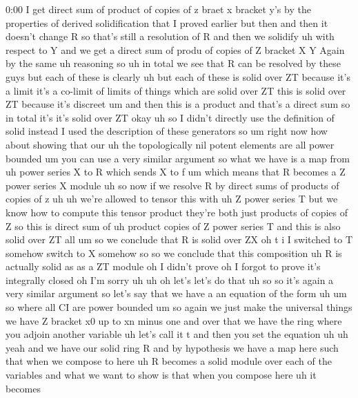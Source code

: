 \begin{unfinished}{0:00}
I  get  direct  sum  of  product  of  copies  of
z  braet
x  bracket  y's  by  the  properties  of
derived  solidification  that  I  proved
earlier  but  then  and  then  it  doesn't
change  R  so  that's  still  a  resolution  of
R  and  then  we  solidify  uh  with  respect
to  Y  and  we  get  a  direct  sum  of  produ  of
copies  of  Z  bracket  X  Y  Again  by  the
same  uh
reasoning  so  uh  in  total  we  see  that  R
can  be  resolved  by  these
guys  but  each  of  these  is  clearly  uh  but
each  of  these  is  solid  over  ZT  because
it's  a  limit  it's  a  co-limit  of  limits
of  things  which  are  solid  over
ZT
this  is  solid  over  ZT  because  it's
discreet  um  and  then  this  is  a  product
and  that's  a  direct  sum  so  in  total  it's
it's  solid  over
ZT
okay
uh  so  I  didn't  directly  use  the
definition  of  solid  instead  I  used  the
description  of  these
generators
so
um  right  now  how  about  showing  that
our  uh  the  topologically  nil  potent
elements  are  all  power  bounded  um  you
can  use  a  very  similar  argument  so  what
we  have  is  a  map  from  uh  power  series  X
to  R  which  sends  X  to
f  um  which  means  that  R  becomes  a  Z
power  series  X
module  uh  so  now  if  we  resolve  R  by
direct  sums  of  products  of  copies  of  z
uh  uh  we're  allowed  to  tensor  this  with
uh  Z  power  series  T  but  we  know  how  to
compute  this  tensor  product  they're  both
just  products  of  copies  of  Z  so  this  is
direct  sum  of
uh  product  copies  of  Z  power  series  T
and  this  is  also
solid  over  ZT
all  um  so  we  conclude  that  R  is  solid
over  ZX  oh  t  i  I  switched  to  T  somehow
switch  to  X  somehow  so  so  we  conclude
that  this  composition  uh  R  is  actually
solid  as  as  a  ZT
module
oh  I  didn't  prove  oh  I  forgot  to  prove
it's  integrally  closed  oh  I'm  sorry
uh  uh  oh  let's  let's  do  that  uh
so  so  it's  again  a  very  similar  argument
so  let's  say  that  we  have  a  an  equation
of  the  form
uh
um  so  where  all  CI  are  power
bounded  um  so  again  we  just  make  the
universal  things  we  have  Z  bracket  x0  up
to  xn  minus  one  and  over  that  we  have
the  ring  where  you  adjoin  another
variable  uh  let's  call  it  t  and  then  you
set  the  equation
uh
uh
yeah  and  we  have  our  solid  ring  R  and  by
hypothesis  we  have  a  map  here  such  that
when  we  compose  to  here  uh  R  becomes  a
solid  module  over  each  of  the
variables  and  what  we  want  to  show  is
that  when  you  compose  here  uh  it  becomes

\end{unfinished}
